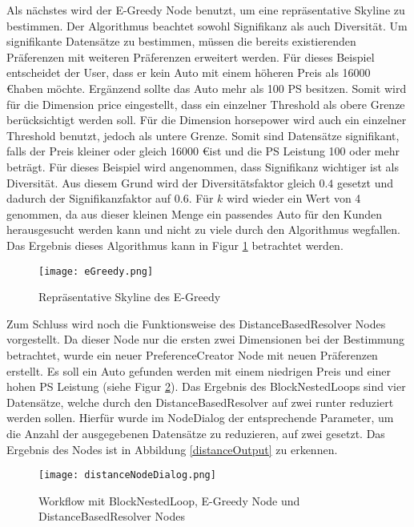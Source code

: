 Als nächstes wird der E-Greedy Node benutzt, um eine repräsentative Skyline zu bestimmen. Der Algorithmus beachtet sowohl Signifikanz als auch Diversität. Um signifikante Datensätze zu bestimmen, müssen die bereits existierenden Präferenzen mit weiteren Präferenzen erweitert werden. Für dieses Beispiel entscheidet der User, dass er kein Auto mit einem höheren Preis als 16000 \euro haben möchte. Ergänzend sollte das Auto mehr als 100 PS besitzen. Somit wird für die Dimension price eingestellt, dass ein einzelner Threshold als obere Grenze berücksichtigt werden soll. Für die Dimension horsepower wird auch ein einzelner Threshold benutzt, jedoch als untere Grenze. Somit sind Datensätze signifikant, falls der Preis kleiner oder gleich 16000 \euro ist und die PS Leistung 100 oder mehr beträgt.
Für dieses Beispiel wird angenommen, dass Signifikanz wichtiger ist als Diversität. Aus diesem Grund wird der Diversitätsfaktor gleich $0.4$ gesetzt und dadurch der Signifikanzfaktor auf $0.6$. Für $k$ wird wieder ein Wert von 4 genommen, da aus dieser kleinen Menge ein passendes Auto für den Kunden herausgesucht werden kann und nicht zu viele durch den Algorithmus wegfallen. Das Ergebnis dieses Algorithmus kann in Figur \ref{img:eGreedy} betrachtet werden.

\begin{figure}[H]
	\centering
	\texttt{[image: eGreedy.png]}
	\caption{Repräsentative Skyline des E-Greedy}
	\label{img:eGreedy}
\end{figure} 

Zum Schluss wird noch die Funktionsweise des DistanceBasedResolver Nodes vorgestellt. Da dieser Node nur die ersten zwei Dimensionen bei der Bestimmung betrachtet, wurde ein neuer PreferenceCreator Node mit neuen Präferenzen erstellt. Es soll ein Auto gefunden werden mit einem niedrigen Preis und einer hohen PS Leistung (siehe Figur \ref{img:distanceNodeDialog}). Das Ergebnis des BlockNestedLoops sind vier Datensätze, welche durch den DistanceBasedResolver auf zwei runter reduziert werden sollen. Hierfür wurde im NodeDialog der entsprechende Parameter, um die Anzahl der ausgegebenen Datensätze zu reduzieren, auf zwei gesetzt. Das Ergebnis des Nodes ist in Abbildung \ref{distanceOutput} zu erkennen.

\begin{figure}[H]
	\centering
	\texttt{[image: distanceNodeDialog.png]}
	\caption{Workflow mit BlockNestedLoop, E-Greedy Node und DistanceBasedResolver Nodes}
	\label{img:distanceNodeDialog}
\end{figure} 

